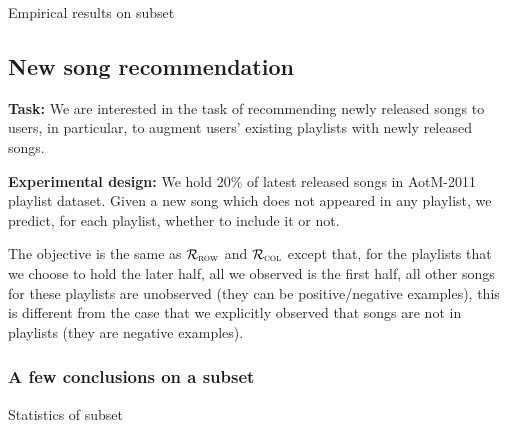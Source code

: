 Empirical results on subset \\


\subsection{New song recommendation}

{\bf Task:} 
We are interested in the task of recommending newly released songs to users,
in particular, to augment users' existing playlists with newly released songs.

{\bf Experimental design:} 
We hold 20\% of latest released songs in AotM-2011~\cite{mcfee2012hypergraph} playlist dataset.
Given a new song which does not appeared in any playlist, 
we predict, for each playlist, whether to include it or not.

The objective is the same as $\mathcal{R}_\textsc{row}$ and $\mathcal{R}_\textsc{col}$ except that,
for the playlists that we choose to hold the later half, all we observed is the first half, 
all other songs for these playlists are unobserved (they can be positive/negative examples),
this is different from the case that we explicitly observed that songs are not in playlists (they are negative examples).


\subsubsection{A few conclusions on a subset}
Statistics of subset \\

